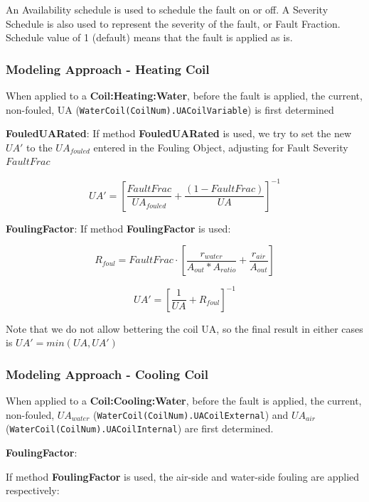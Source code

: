 An Availability schedule is used to schedule the fault on or off.
A Severity Schedule is also used to represent the severity of the fault, or Fault Fraction. Schedule value of 1 (default) means that the fault is applied as is.

\subsubsection{Modeling Approach - Heating Coil}\label{modeling-approach-fouling-coil-heating}

When applied to a \textbf{Coil:Heating:Water}, before the fault is applied, the current, non-fouled, UA (\lstinline!WaterCoil(CoilNum).UACoilVariable!) is first determined

\textbf{FouledUARated}:
If method \textbf{FouledUARated} is used, we try to set the new $UA'$ to the $UA_{fouled}$ entered in the Fouling Object, adjusting for Fault Severity $FaultFrac$

\begin{equation}
    UA' = [\frac{FaultFrac}{UA_{fouled}}+\frac{(1-FaultFrac)}{UA}]^{-1}
\end{equation}

\textbf{FoulingFactor}:
If method \textbf{FoulingFactor} is used:

\begin{equation}
    R_{foul} = FaultFrac \cdot [ \frac{r_{water}}{A_{out}*A_{ratio}} + \frac{r_{air}}{A_{out}} ]
\end{equation}

\begin{equation}
    UA' = [\frac{1}{UA} + R_{foul}]^{-1}
\end{equation}

Note that we do not allow bettering the coil UA, so the final result in either cases is $UA' = min(UA, UA')$


\subsubsection{Modeling Approach - Cooling Coil}\label{modeling-approach-fouling-coil-cooling}

When applied to a \textbf{Coil:Cooling:Water}, before the fault is applied, the current, non-fouled, $UA_{water}$ (\lstinline!WaterCoil(CoilNum).UACoilExternal!) and
$UA_{air}$ (\lstinline!WaterCoil(CoilNum).UACoilInternal!) are first determined.

\textbf{FoulingFactor}:

If method \textbf{FoulingFactor} is used, the air-side and water-side fouling are applied respectively:

